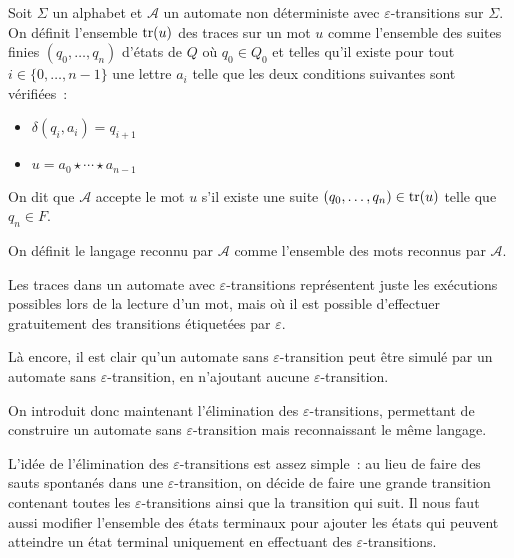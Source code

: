 \begin{definition}
  Soit $\Sigma$ un alphabet et $\mathcal A$ un automate non déterministe avec
  $\varepsilon$-transitions sur $\Sigma$. On définit l'ensemble $\operatorname{tr}(u)$ des
  traces sur un mot $u$ comme l'ensemble des suites finies $(q_0,\ldots,q_n)$
  d'états de $Q$ où $q_0 \in Q_0$ et telles qu'il existe pour tout
  $i \in \{0,\ldots,n-1\}$ une lettre $a_i$ telle que les deux conditions
  suivantes sont vérifiées~:
  \begin{itemize}
  \item $\delta(q_i,a_i) = q_{i+1}$
  \item $u = a_0\star\cdots\star a_{n-1}$
  \end{itemize}
  On dit que $\mathcal A$ accepte le mot $u$
  s'il existe une suite $(q_0,\ldots,q_n) \in \operatorname{tr}(u)$ telle que $q_n \in F$.

  On définit le langage reconnu par $\mathcal A$ comme l'ensemble des mots
  reconnus par $\mathcal A$.
\end{definition}

Les traces dans un automate avec $\varepsilon$-transitions représentent juste
les exécutions possibles lors de la lecture d'un mot, mais où il est possible
d'effectuer gratuitement des transitions étiquetées par $\varepsilon$.

Là encore, il est clair qu'un automate sans $\varepsilon$-transition peut être
simulé par un automate sans $\varepsilon$-transition, en n'ajoutant aucune
$\varepsilon$-transition.

On introduit donc maintenant l'élimination des $\varepsilon$-transitions,
permettant de construire un automate sans $\varepsilon$-transition mais
reconnaissant le même langage.

L'idée de l'élimination des $\varepsilon$-transitions est assez simple~: au lieu
de faire des sauts spontanés dans une $\varepsilon$-transition, on décide de
faire une grande transition contenant toutes les $\varepsilon$-transitions ainsi
que la transition qui suit. Il nous faut aussi modifier l'ensemble des états
terminaux pour ajouter les états qui peuvent atteindre un état terminal
uniquement en effectuant des $\varepsilon$-transitions.

